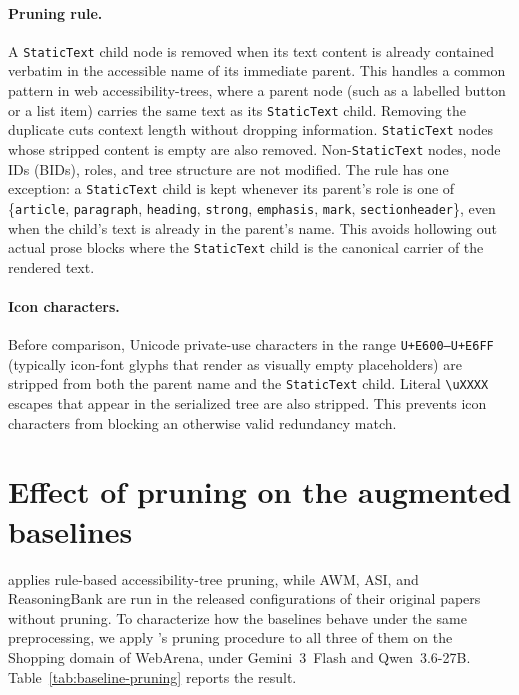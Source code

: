 \paragraph{Pruning rule.}
A \texttt{StaticText} child node is removed when its text content is already contained verbatim in the accessible name of its immediate parent.
This handles a common pattern in web accessibility-trees, where a parent node (such as a labelled button or a list item) carries the same text as its \texttt{StaticText} child.
Removing the duplicate cuts context length without dropping information.
\texttt{StaticText} nodes whose stripped content is empty are also removed.
Non-\texttt{StaticText} nodes, node IDs (BIDs), roles, and tree structure are not modified.
% 
The rule has one exception: a \texttt{StaticText} child is kept whenever its parent's role is one of \{\texttt{article}, \texttt{paragraph}, \texttt{heading}, \texttt{strong}, \texttt{emphasis}, \texttt{mark}, \texttt{sectionheader}\}, even when the child's text is already in the parent's name.
This avoids hollowing out actual prose blocks where the \texttt{StaticText} child is the canonical carrier of the rendered text.

\paragraph{Icon characters.}
Before comparison, Unicode private-use characters in the range \texttt{U+E600--U+E6FF} (typically icon-font glyphs that render as visually empty placeholders) are stripped from both the parent name and the \texttt{StaticText} child.
Literal \texttt{\textbackslash uXXXX} escapes that appear in the serialized tree are also stripped.
This prevents icon characters from blocking an otherwise valid redundancy match.


\section{Effect of pruning on the augmented baselines}
\label{app:baseline-pruning}

\budgetactor{} applies rule-based accessibility-tree pruning, while AWM, ASI, and ReasoningBank are run in the released configurations of their original papers without pruning.
To characterize how the baselines behave under the same preprocessing, we apply \budgetactor{}'s pruning procedure to all three of them on the Shopping domain of WebArena, under Gemini~3~Flash and Qwen~3.6-27B.
Table~\ref{tab:baseline-pruning} reports the result.

